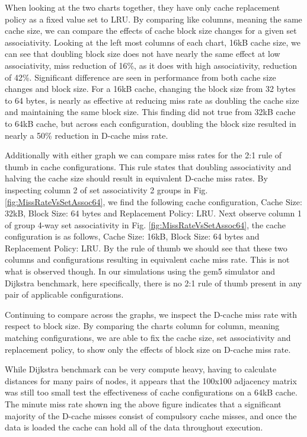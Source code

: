 \documentclass[conference]{IEEEtran}
\begin{document}
When looking at the two charts together, they have only cache replacement policy as a fixed value set to LRU. By comparing like columns, meaning the same cache size, we can compare the effects of cache block size changes for a given set associativity. Looking at the left most columns of each chart, 16kB cache size, we can see that doubling block size does not have nearly the same effect at low associativity, miss reduction of 16\%, as it does with high associativity, reduction of 42\%. Significant difference are seen in performance from both cache size changes and block size. For a 16kB cache, changing the block size from 32 bytes to 64 bytes, is nearly as effective at reducing miss rate as doubling the cache size and maintaining the same block size. This finding did not true from 32kB cache to 64kB cache, but across each configuration, doubling the block size resulted in nearly a 50\% reduction in D-cache miss rate.

Additionally with either graph we can compare miss rates for the 2:1 rule of thumb in cache configurations. This rule states that doubling associativity and halving the cache size should result in equivalent D-cache miss rates. By inspecting column 2 of set associativity 2 groups in Fig. \ref{fig:MissRateVsSetAssoc64}, we find the following cache configuration, Cache Size: 32kB, Block Size: 64 bytes and Replacement Policy: LRU. Next observe column 1 of group 4-way set associativity in Fig. \ref{fig:MissRateVsSetAssoc64}, the cache configuration is as follows, Cache Size: 16kB, Block Size: 64 bytes and Replacement Policy: LRU. By the rule of thumb we should see that these two columns and configurations resulting in equivalent cache miss rate. This is not what is observed though. In our simulations using the gem5 simulator and Dijkstra benchmark, here specifically, there is no 2:1 rule of thumb present in any pair of applicable configurations.

Continuing to compare across the graphs, we inspect the D-cache miss rate with respect to block size. By comparing the charts column for column, meaning matching configurations, we are able to fix the cache size, set associativity and replacement policy, to show only the effects of block size on D-cache miss rate. 

While Dijkstra benchmark can be very compute heavy, having to calculate distances for many pairs of nodes, it appears that the 100x100 adjacency matrix was still too small test the effectiveness of cache configurations on a 64kB cache. The minute miss rate shown ing the above figure indicates that a significant majority of the D-cache misses consist of compulsory cache misses, and once the data is loaded the cache can hold all of the data throughout execution.
\end{document}
